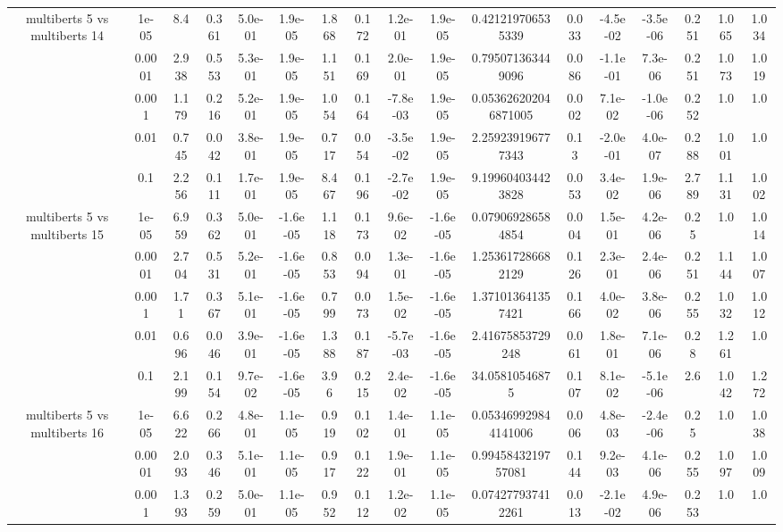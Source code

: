 \begin{tabular}{|c|c|c|c|c|c|c|c|c|c|c|c|c|c|c|c|c|}
\hline
\multirow{5}{*}{multiberts 5 vs multiberts 14} & 1e-05 & 8.4 & 0.361 & 5.0e-01 & 1.9e-05 & 1.868 & 0.172 & 1.2e-01 & 1.9e-05 & 0.421219706535339 & 0.033 & -4.5e-02 & -3.5e-06 & 0.251 & 1.065 & 1.034 \\
 & 0.0001 & 2.938 & 0.553 & 5.3e-01 & 1.9e-05 & 1.151 & 0.169 & 2.0e-01 & 1.9e-05 & 0.795071363449096 & 0.086 & -1.1e-01 & 7.3e-06 & 0.251 & 1.073 & 1.019 \\
 & 0.001 & 1.179 & 0.216 & 5.2e-01 & 1.9e-05 & 1.054 & 0.164 & -7.8e-03 & 1.9e-05 & 0.053626202046871005 & 0.002 & 7.1e-02 & -1.0e-06 & 0.252 & 1.0 & 1.0 \\
 & 0.01 & 0.745 & 0.042 & 3.8e-01 & 1.9e-05 & 0.717 & 0.054 & -3.5e-02 & 1.9e-05 & 2.259239196777343 & 0.13 & -2.0e-01 & 4.0e-07 & 0.288 & 1.001 & 1.0 \\
 & 0.1 & 2.256 & 0.111 & 1.7e-01 & 1.9e-05 & 8.467 & 0.196 & -2.7e-02 & 1.9e-05 & 9.199604034423828 & 0.053 & 3.4e-02 & 1.9e-06 & 2.789 & 1.131 & 1.002 \\
\hline
\multirow{5}{*}{multiberts 5 vs multiberts 15} & 1e-05 & 6.959 & 0.362 & 5.0e-01 & -1.6e-05 & 1.118 & 0.173 & 9.6e-02 & -1.6e-05 & 0.079069286584854 & 0.004 & 1.5e-01 & 4.2e-06 & 0.25 & 1.0 & 1.014 \\
 & 0.0001 & 2.704 & 0.531 & 5.2e-01 & -1.6e-05 & 0.853 & 0.094 & 1.3e-01 & -1.6e-05 & 1.253617286682129 & 0.126 & 2.3e-01 & 2.4e-06 & 0.251 & 1.144 & 1.007 \\
 & 0.001 & 1.71 & 0.367 & 5.1e-01 & -1.6e-05 & 0.799 & 0.073 & 1.5e-02 & -1.6e-05 & 1.371013641357421 & 0.166 & 4.0e-02 & 3.8e-06 & 0.255 & 1.032 & 1.012 \\
 & 0.01 & 0.696 & 0.046 & 3.9e-01 & -1.6e-05 & 1.388 & 0.187 & -5.7e-03 & -1.6e-05 & 2.41675853729248 & 0.061 & 1.8e-01 & 7.1e-06 & 0.28 & 1.261 & 1.0 \\
 & 0.1 & 2.199 & 0.154 & 9.7e-02 & -1.6e-05 & 3.96 & 0.215 & 2.4e-02 & -1.6e-05 & 34.05810546875 & 0.107 & 8.1e-02 & -5.1e-06 & 2.6 & 1.042 & 1.272 \\
\hline
\multirow{5}{*}{multiberts 5 vs multiberts 16} & 1e-05 & 6.622 & 0.266 & 4.8e-01 & 1.1e-05 & 0.919 & 0.102 & 1.4e-01 & 1.1e-05 & 0.053469929844141006 & 0.006 & 4.8e-03 & -2.4e-06 & 0.25 & 1.0 & 1.038 \\
 & 0.0001 & 2.093 & 0.346 & 5.1e-01 & 1.1e-05 & 0.917 & 0.122 & 1.9e-01 & 1.1e-05 & 0.9945843219757081 & 0.144 & 9.2e-03 & 4.1e-06 & 0.255 & 1.097 & 1.009 \\
 & 0.001 & 1.393 & 0.259 & 5.0e-01 & 1.1e-05 & 0.952 & 0.112 & 1.2e-02 & 1.1e-05 & 0.074277937412261 & 0.013 & -2.1e-02 & 4.9e-06 & 0.253 & 1.0 & 1.0 \\

\end{tabular}
